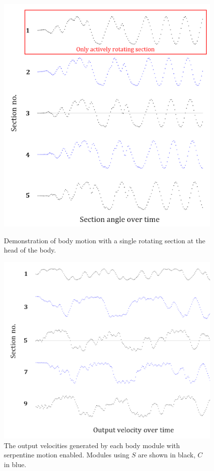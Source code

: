\documentclass{article}
\begin{document}
\begin{figure}[H]
\begin{minipage}[b]{.4\textwidth}
\centering
\includegraphics[width=1\textwidth]{cpgMirroring}
\caption{Demonstration of body motion with a single rotating section at the head of the body.}
\end{minipage}
\hfill
\begin{minipage}[b]{.5\textwidth}
\centering
\includegraphics[width=1\textwidth]{cpgSerpentine}
\caption{The output velocities generated by each body module with serpentine motion enabled. Modules using $S$ are shown in black, $C$ in blue.}
\end{minipage}
\end{figure}
\end{document}
